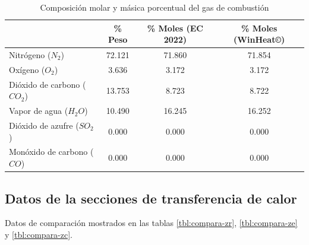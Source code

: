 \begin{table}
\begin{center}
\caption[Composición del gas de combustión]{Composición molar y másica porcentual del gas de combustión}
\label{tbl:combustion-gas}
\begin{tabular}{l|c|c|c}
		& \% Peso & \% Moles (EC 2022)	& \% Moles (WinHeat\copyright) \\
	\hline
	Nitrógeno ($N_2$)			& 72.121	& 71.860	& 71.854	\\
	Oxígeno ($O_2$)				& 3.636 	& 3.172		& 3.172		\\
	Dióxido de carbono ($CO_2$)	& 13.753	& 8.723		& 8.722		\\
	Vapor de agua ($H_2O$)		& 10.490	& 16.245	& 16.252	\\
	Dióxido de azufre ($SO_2$)	& 0.000 	& 0.000		& 0.000		\\
	Monóxido de carbono ($CO$)	& 0.000 	& 0.000		& 0.000		\\
\end{tabular}
\end{center}
\end{table}

\subsection{Datos de la secciones de transferencia de calor}

\par Datos de comparación mostrados en las tablas \ref{tbl:compara-zr}, \ref{tbl:compara-ze} y \ref{tbl:compara-zc}.

